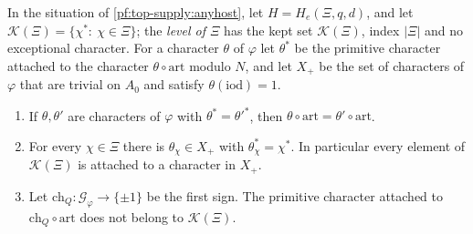 \begin{lemma}\label{pf:top-supply:anykept}
In the situation of \cref{pf:top-supply:anyhost}, let $H=H_e(\Xi,q,d)$, and let $\mathcal K(\Xi)=\{\chi^*:\ \chi\in\Xi\}$; the
\emph{level of $\Xi$} has the kept set $\mathcal K(\Xi)$, index $|\Xi|$ and no exceptional character. For a character
$\theta$ of $\varphi$ let $\theta^*$ be the primitive character attached to the character $\theta\circ\mathrm{art}$ modulo $N$,
and let $X_+$ be the set of characters of $\varphi$ that are trivial on $A_0$ and satisfy $\theta(\mathrm{iod})=1$.
\begin{enumerate}[label=(\roman*)]
\item If $\theta,\theta'$ are characters of $\varphi$ with $\theta^*=\theta'^*$, then $\theta\circ\mathrm{art}=\theta'\circ\mathrm{art}$.
\item For every $\chi\in\Xi$ there is $\theta_\chi\in X_+$ with $\theta_\chi^*=\chi^*$. In particular every element of
$\mathcal K(\Xi)$ is attached to a character in $X_+$.
\item Let $\mathrm{ch}_Q:\mathcal G_\varphi\to\{\pm1\}$ be the first sign. The primitive character attached to
$\mathrm{ch}_Q\circ\mathrm{art}$ does not belong to $\mathcal K(\Xi)$.
\end{enumerate}
  
 
  
 
 
\end{lemma}

